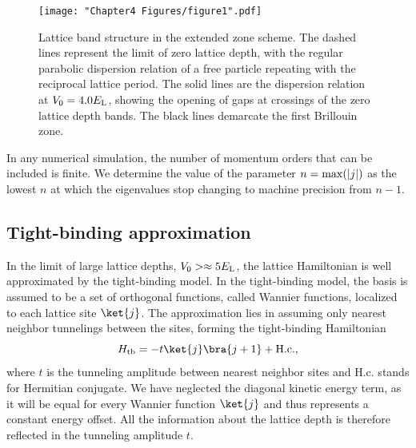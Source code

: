 \begin{figure}
	\texttt{[image: "Chapter4 Figures/figure1".pdf]}
\caption[Lattice band structure in the extended zone scheme]{Lattice band structure in the extended zone scheme. The dashed lines represent the limit of zero lattice depth, with the regular parabolic dispersion relation of a free particle repeating with the reciprocal lattice period. The solid lines are the dispersion relation at $V_0 = 4.0 E_{\rm L}$, showing the opening of gaps at crossings of the zero lattice depth bands. The black lines demarcate the first Brillouin zone. }
\label{fig:latticeBandStructure}
\end{figure}

In any numerical simulation, the number of momentum orders that can be included is finite. We determine the value of the parameter $n = {\rm max}(|j|)$ as the lowest $n$ at which the eigenvalues stop changing to machine precision from $n-1$.

\subsection{Tight-binding approximation}\label{sec:tightBinding}

In the limit of large lattice depths, $V_0 > \approx 5 E_{\rm L}$, the lattice Hamiltonian is well approximated by the tight-binding model. In the tight-binding model, the basis is assumed to be a set of orthogonal functions, called Wannier functions, localized to each lattice site $\ket{j}$.  The approximation lies in assuming only nearest neighbor tunnelings between the sites, forming the tight-binding Hamiltonian
\begin{equation}
H_{\rm tb} = - t \ket{j}\bra{j+1} + {\rm H.c.},
\end{equation}
where $t$ is the tunneling amplitude between nearest neighbor sites and H.c. stands for Hermitian conjugate. We have neglected the diagonal kinetic energy term, as it will be equal for every Wannier function $\ket{j}$ and thus represents a constant energy offset. All the information about the lattice depth is therefore reflected in the tunneling amplitude $t$. 


